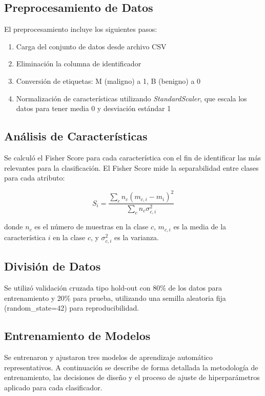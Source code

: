 \documentclass[conference]{IEEEtran}
\begin{document}
\subsection{Preprocesamiento de Datos}
El preprocesamiento incluye los siguientes pasos:
\begin{enumerate}
\item Carga del conjunto de datos desde archivo CSV
\item Eliminación la columna de identificador
\item Conversión de etiquetas: M (maligno) a 1, B (benigno) a 0
\item Normalización de características utilizando \textit{StandardScaler}, que escala los datos para tener media 0 y desviación estándar 1
\end{enumerate}

\subsection{Análisis de Características}
Se calculó el Fisher Score para cada característica con el fin de identificar las más relevantes para la clasificación. El Fisher Score mide la separabilidad entre clases para cada atributo:

\begin{equation}
S_i = \frac{\sum_{c} n_c (m_{c,i} - m_i)^2}{\sum_{c} n_c \sigma_{c,i}^2}
\end{equation}

donde $n_c$ es el número de muestras en la clase $c$, $m_{c,i}$ es la media de la característica $i$ en la clase $c$, y $\sigma_{c,i}^2$ es la varianza.

\subsection{División de Datos}
Se utilizó validación cruzada tipo hold-out con 80\% de los datos para entrenamiento y 20\% para prueba, utilizando una semilla aleatoria fija (random\_state=42) para reproducibilidad.

\subsection{Entrenamiento de Modelos}
Se entrenaron y ajustaron tres modelos de aprendizaje automático representativos. A continuación se describe de forma detallada la metodología de entrenamiento, las decisiones de diseño y el proceso de ajuste de hiperparámetros aplicado para cada clasificador.
\end{document}
